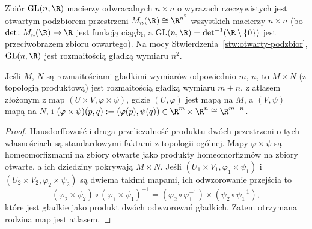 \begin{przyklad}
Zbiór $\mathrm{GL}(n,\R)$ macierzy odwracalnych $n\times n$ o wyrazach rzeczywistych jest
otwartym podzbiorem przestrzeni $M_n(\R)\cong\R^{n^2}$ wszystkich macierzy $n\times n$ (bo
$\det\colon M_n(\R)\to\R$ jest funkcją ciągłą, a $\mathrm{GL}(n,\R)=\det^{-1}(\R\setminus
\{0\})$ jest przeciwobrazem zbioru otwartego). Na mocy Stwierdzenia~\ref{stw:otwarty-podzbior},
$\mathrm{GL}(n,\R)$ jest rozmaitością gładką wymiaru $n^2$.
\end{przyklad}

\begin{stwierdzenie}
Jeśli $M$, $N$ są rozmaitościami gładkimi wymiarów odpowiednio $m$, $n$, to $M\times N$
(z topologią produktową) jest rozmaitością gładką wymiaru $m+n$, z atlasem złożonym z map
$(U\times V,\varphi\times\psi)$, gdzie $(U,\varphi)$ jest mapą na $M$, a $(V,\psi)$ mapą na
$N$, i $(\varphi\times\psi)(p,q):=(\varphi(p),\psi(q))\in\R^m\times\R^n\cong\R^{m+n}$.
\end{stwierdzenie}

\begin{proof}
Hausdorffowość i druga przeliczalność produktu dwóch przestrzeni o tych własnościach są
standardowymi faktami z topologii ogólnej. Mapy $\varphi\times\psi$ są homeomorfizmami na
zbiory otwarte jako produkty homeomorfizmów na zbiory otwarte, a ich dziedziny pokrywają
$M\times N$. Jeśli $(U_1\times V_1,\varphi_1\times\psi_1)$ i $(U_2\times V_2,\varphi_2
\times\psi_2)$ są dwiema takimi mapami, ich odwzorowanie przejścia to
\[
(\varphi_2\times\psi_2)\circ(\varphi_1\times\psi_1)^{-1}=(\varphi_2\circ\varphi_1^{-1})
\times(\psi_2\circ\psi_1^{-1}),
\]
które jest gładkie jako produkt dwóch odwzorowań gładkich. Zatem otrzymana rodzina map
jest atlasem.
\end{proof}


